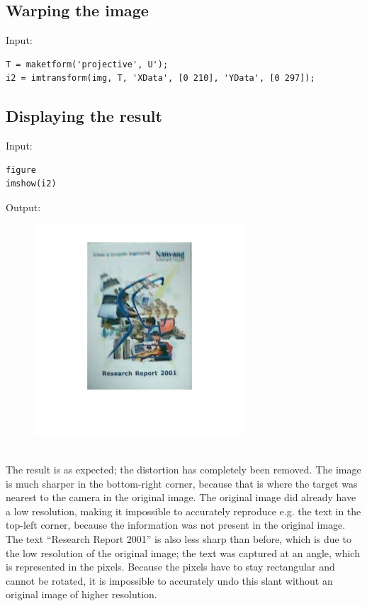 \documentclass[12pt, a4paper]{article}
\begin{document}
\subsection{Warping the image}
Input:
\begin{verbatim}
T = maketform('projective', U');
i2 = imtransform(img, T, 'XData', [0 210], 'YData', [0 297]);
\end{verbatim}
\newpage
\subsection{Displaying the result}
Input:
\begin{verbatim}
figure
imshow(i2)
\end{verbatim}
Output:
\begin{figure}[H]
    \centering
    \includegraphics[width=0.7\textwidth]{fig33.png}
\end{figure}
~\\
The result is as expected; the distortion has completely been removed. The image is much sharper in the bottom-right corner, because that is where the target was nearest to the camera in the original image. The original image did already have a low resolution, making it impossible to accurately reproduce e.g. the text in the top-left corner, because the information was not present in the original image. The text ``Research Report 2001'' is also less sharp than before, which is due to the low resolution of the original image; the text was captured at an angle, which is represented in the pixels. Because the pixels have to stay rectangular and cannot be rotated, it is impossible to accurately undo this slant without an original image of higher resolution.
\end{document}
